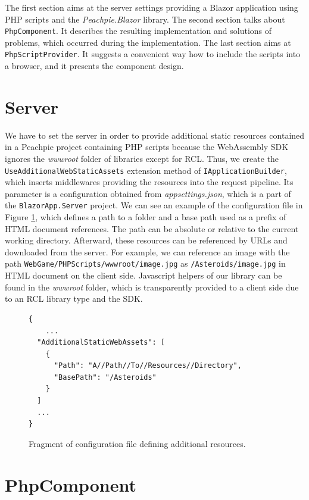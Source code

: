 \par
The first section aims at the server settings providing a Blazor application using PHP scripts and the \textit{Peachpie.Blazor} library.
The second section talks about \texttt{PhpComponent}.
It describes the resulting implementation and solutions of problems, which occurred during the implementation.
The last section aims at \texttt{PhpScriptProvider}.
It suggests a convenient way how to include the scripts into a browser, and it presents the component design.

\section{Server}

We have to set the server in order to provide additional static resources contained in a Peachpie project containing PHP scripts because the WebAssembly SDK ignores the \textit{wwwroot} folder of libraries except for RCL.
Thus, we create the \texttt{UseAdditionalWebStaticAssets} extension method of \texttt{IApplicationBuilder}, which inserts middlewares providing the resources into the request pipeline.
Its parameter is a configuration obtained from \textit{appsettings.json}, which is a part of the \texttt{BlazorApp.Server} project.
We can see an example of the configuration file in Figure \ref{img19:settings}, which defines a path to a folder and a base path used as a prefix of HTML document references.
The path can be absolute or relative to the current working directory.
Afterward, these resources can be referenced by URLs and downloaded from the server.
For example, we can reference an image with the path \texttt{WebGame/PHPScripts/wwwroot/image.jpg} as \texttt{/Asteroids/image.jpg} in HTML document on the client side.
Javascript helpers of our library can be found in the \textit{wwwroot} folder, which is transparently provided to a client side due to an RCL library type and the SDK.
\par
\begin{figure}[H]
\begin{lstlisting}
{
	...
  "AdditionalStaticWebAssets": [
    {
      "Path": "A//Path//To//Resources//Directory",
      "BasePath": "/Asteroids"
    }
  ]
  ...
}

\end{lstlisting}
\caption{Fragment of configuration file defining additional resources.}
\label{img19:settings}
\end{figure}

\section{PhpComponent}

